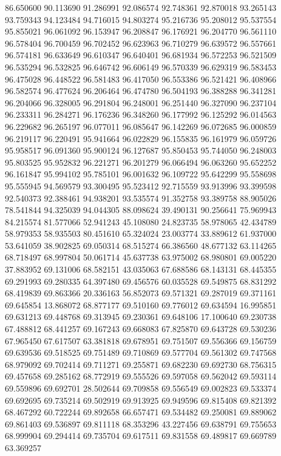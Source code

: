86.650600
90.113690
91.286991
92.086574
92.748361
92.870018
93.265143
93.759343
94.123484
94.716015
94.803274
95.216736
95.208012
95.537554
95.855021
96.061092
96.153947
96.208847
96.176921
96.204770
96.561110
96.578404
96.700459
96.702452
96.623963
96.710279
96.639572
96.557661
96.574181
96.633649
96.610347
96.640401
96.681934
96.572253
96.521509
96.535294
96.532825
96.646742
96.606149
96.570339
96.629319
96.583453
96.475028
96.448522
96.581483
96.417050
96.553386
96.521421
96.408966
96.582574
96.477624
96.206464
96.474780
96.504193
96.388288
96.341281
96.204066
96.328005
96.291804
96.248001
96.251440
96.327090
96.237104
96.233311
96.284271
96.176236
96.348260
96.177992
96.125292
96.014563
96.229682
96.265197
96.077011
96.085647
96.142269
96.072685
96.000859
96.219117
96.220491
95.941664
96.022829
96.155835
96.161979
96.059726
95.958517
96.091360
95.900124
96.127687
95.850453
95.744050
96.248003
95.803525
95.952832
96.221271
96.201279
96.066494
96.063260
95.652252
96.161847
95.994102
95.785101
96.001632
96.109722
95.642299
95.558698
95.555945
94.569579
93.300495
95.523412
92.715559
93.913996
93.399598
92.540373
92.388461
94.938201
93.535574
91.352758
93.389758
88.905026
78.541844
94.325039
94.044305
88.098624
39.490131
90.256641
75.969943
84.215574
81.577066
52.941243
45.108080
24.823735
58.978065
42.434789
58.979353
58.935503
80.451610
65.324024
23.003774
33.889612
61.937000
53.641059
38.902825
69.050314
68.515274
66.386560
48.677132
63.114265
68.718497
68.997804
50.061714
45.637738
63.975002
68.980801
69.005220
37.883952
69.131006
68.582151
43.035063
67.688586
68.143131
68.445355
69.291993
69.280335
64.397480
69.456576
60.035528
69.549875
68.831292
68.419839
69.863366
20.336163
56.852073
69.571321
69.287019
69.371161
69.645854
13.868072
68.877177
69.510160
69.776012
69.634594
16.995851
69.631213
69.448768
69.313945
69.230361
69.648106
17.100640
69.230738
67.488812
68.441257
69.167243
69.668083
67.825870
69.643728
69.530236
67.965450
67.617507
63.381818
69.678951
69.751507
69.556366
69.156759
69.639536
69.518525
69.751489
69.710869
69.577704
69.561302
69.747568
68.979092
69.702414
69.711271
69.255871
69.682230
69.692730
68.756315
69.457658
69.285162
68.772919
69.555526
69.597058
69.562042
69.593114
69.559896
69.692701
28.502644
69.709858
69.556549
69.002823
69.533374
69.692695
69.735214
69.502919
69.913925
69.949596
69.815408
69.821392
68.467292
60.722244
69.892658
66.657471
69.534482
69.250081
69.889062
69.861403
69.536897
69.811118
68.353296
43.227456
69.638791
69.755653
68.999904
69.294414
69.735704
69.617511
69.831558
69.489817
69.669789
63.369257
